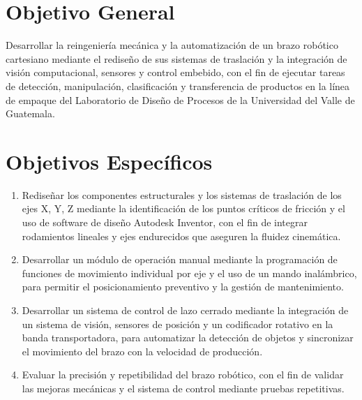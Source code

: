 \section{Objetivo General}
Desarrollar la reingeniería mecánica y la automatización de un brazo robótico cartesiano mediante el rediseño de sus sistemas de traslación y la integración de visión computacional, sensores y control embebido, con el fin de ejecutar tareas de detección, manipulación, clasificación y transferencia de productos en la línea de empaque del Laboratorio de Diseño de Procesos de la Universidad del Valle de Guatemala.

\section{Objetivos Específicos}
\begin{enumerate}
\item Rediseñar los componentes estructurales y los sistemas de traslación de los ejes X, Y, Z mediante la identificación de los puntos críticos de fricción y el uso de software de diseño Autodesk Inventor, con el fin de integrar rodamientos lineales y ejes endurecidos que aseguren la fluidez cinemática. 
\item Desarrollar un módulo de operación manual mediante la programación de funciones de movimiento individual por eje y el uso de un mando inalámbrico, para permitir el posicionamiento preventivo y la gestión de mantenimiento.
\item Desarrollar un sistema de control de lazo cerrado mediante la integración de un sistema de visión, sensores de posición y un codificador rotativo en la banda transportadora, para automatizar la detección de objetos y sincronizar el movimiento del brazo con la velocidad de producción.
\item Evaluar la precisión y repetibilidad del brazo robótico, con el fin de validar las mejoras mecánicas y el sistema de control mediante pruebas repetitivas. 
\end{enumerate}